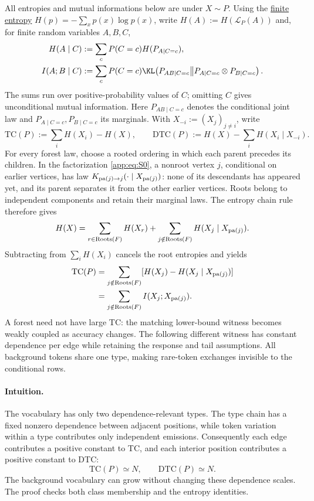 All entropies and mutual informations below are under $X\sim P$.
Using the \hyperlink{app-finite-entropy}{finite entropy}
$H(p)=-\sum_xp(x)\log p(x)$, write $H(A):=H(\mathcal L_P(A))$ and,
for finite random variables $A,B,C$,
\[
 \begin{aligned}
 H(A\mid C)&:=\sum_cP(C=c)H(P_{A\mid C=c}),\\
 I(A;B\mid C)&:=\sum_cP(C=c)
   \KLDivergence{P_{AB\mid C=c}}
                {P_{A\mid C=c}\otimes P_{B\mid C=c}}.
 \end{aligned}
\]
The sums run over positive-probability values of $C$;
omitting $C$ gives unconditional mutual information.
Here $P_{AB\mid C=c}$ denotes the conditional joint law and
$P_{A\mid C=c},P_{B\mid C=c}$ its marginals.
With $X_{-i}:=(X_j)_{j\ne i}$, write
\[
 \mathrm{TC}(P):=\sum_iH(X_i)-H(X),\qquad
 \mathrm{DTC}(P):=H(X)-\sum_iH(X_i\mid X_{-i}).
\]
For every forest law, choose a rooted ordering in which each parent
precedes its children.  In the factorization \eqref{app:eq:S0}, a nonroot
vertex $j$, conditional on earlier vertices, has law
$K_{\operatorname{pa}(j)\to j}(\cdot\mid X_{\operatorname{pa}(j)})$:
none of its descendants has appeared yet, and its parent separates it
from the other earlier vertices.  Roots belong to independent components
and retain their marginal laws.  The entropy chain rule therefore gives
\[
 H(X)=\sum_{r\in\operatorname{Roots}(F)}H(X_r)
       +\sum_{j\notin\operatorname{Roots}(F)}H(X_j\mid X_{\operatorname{pa}(j)}).
\]
Subtracting from $\sum_iH(X_i)$ cancels the
root entropies and yields
\begin{align}
 \mathrm{TC}(P)
 &=\sum_{j\notin\operatorname{Roots}(F)}
      [H(X_j)-H(X_j\mid X_{\operatorname{pa}(j)})]\notag\\
 &=\sum_{j\notin\operatorname{Roots}(F)}I(X_j;X_{\operatorname{pa}(j)}).
 \label{app:eq:forest-tc-identity}
\end{align}
A forest need not have large TC: the matching lower-bound witness becomes
weakly coupled as accuracy changes.  The following different witness
has constant dependence per edge while retaining the response and tail
assumptions.  All background tokens share one type, making rare-token
exchanges invisible to the conditional rows.

\paragraph{Intuition.}
The vocabulary has only two dependence-relevant types.  The type chain
has a fixed nonzero dependence between adjacent positions, while token
variation within a type contributes only independent emissions.
Consequently each edge contributes a positive constant to TC, and each
interior position contributes a positive constant to DTC:
\[
 \mathrm{TC}(P)\simeq N,\qquad \mathrm{DTC}(P)\simeq N.
\]
The background vocabulary can grow without changing these dependence
scales.  The proof checks both class membership and the entropy identities.

